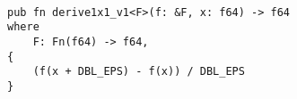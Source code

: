 \begin{lstlisting}[caption=Calculo de Derivada em Rust.]

pub fn derive1x1_v1<F>(f: &F, x: f64) -> f64
where
    F: Fn(f64) -> f64,
{
    (f(x + DBL_EPS) - f(x)) / DBL_EPS
}


\end{lstlisting}
